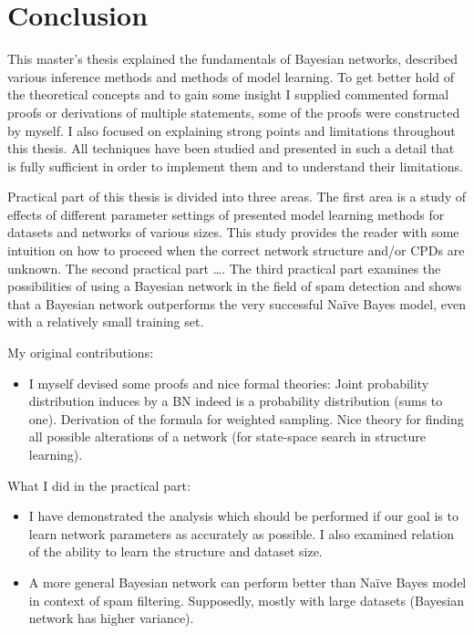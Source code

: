 \documentclass[english,cover]{fitthesis} %
\newcommand{\todo}[1]{{\color{red}#1}}
\begin{document}
\chapter{Conclusion}
This master's thesis explained the fundamentals of Bayesian networks, described various inference methods and methods of model learning. To get better hold of the theoretical concepts and to gain some insight I supplied commented formal proofs or derivations of multiple statements, some of the proofs were constructed by myself. I also focused on explaining strong points and limitations throughout this thesis. All techniques have been studied and presented in such a detail that is fully sufficient in order to implement them and to understand their limitations.

Practical part of this thesis is divided into three areas. The first area is a study of effects of different parameter settings of presented model learning methods for datasets and networks of various sizes. This study provides the reader with some intuition on how to proceed when the correct network structure and/or CPDs are unknown. The second practical part \todo{\dots}. The third practical part examines the possibilities of using a Bayesian network in the field of spam detection and shows that a Bayesian network outperforms the very successful Naïve Bayes model, even with a relatively small training set.

\bigskip

My original contributions:
\begin{itemize}
	\item I myself devised some proofs and nice formal theories: Joint probability distribution induces by a BN indeed is a probability distribution (sums to one). Derivation of the formula for weighted sampling. Nice theory for finding all possible alterations of a network (for state-space search in structure learning).
\end{itemize}

What I did in the practical part:
\begin{itemize}
    \item I have demonstrated the analysis which should be performed if our goal is to learn network parameters as accurately as possible. I also examined relation of the ability to learn the  structure and dataset size.
    \item A more general Bayesian network can perform better than Naïve Bayes model in context of spam filtering. Supposedly, mostly with large datasets (Bayesian network has higher variance).
\end{itemize}
\end{document}
